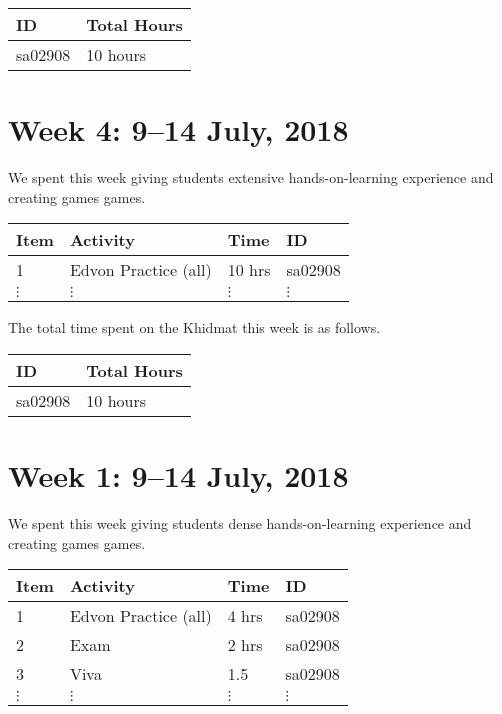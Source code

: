 \documentclass{article}
\begin{document}
\begin{tabular}{|l|l|}
  \hline
  ID & Total Hours\\\hline\hline
  sa02908 & 10 hours\\\hline
\end{tabular}


\newpage 
\section*{Week 4: 9--14 July, 2018}

We spent this week giving students extensive hands-on-learning experience and creating games games.

\begin{tabular}{|l|l|l|l|}
  \hline
  Item  & Activity & Time & ID \\\hline\hline
  1 & Edvon Practice (all) & 10 hrs & sa02908 \\\hline
  $\vdots$ & $\vdots$ & $\vdots$ & $\vdots$ \\\hline
\end{tabular}

The total time spent on the Khidmat this week is as follows.

\begin{tabular}{|l|l|}
  \hline
  ID & Total Hours\\\hline\hline
  sa02908 & 10 hours\\\hline
\end{tabular}


\newpage
\section*{Week 1: 9--14 July, 2018}

We spent this week giving students dense hands-on-learning experience and creating games games.

\begin{tabular}{|l|l|l|l|}
  \hline
  Item  & Activity & Time & ID \\\hline\hline
  1 & Edvon Practice (all) & 4 hrs & sa02908 \\\hline
  2 & Exam & 2 hrs & sa02908 \\\hline
  3 & Viva & 1.5 & sa02908 \\\hline
  $\vdots$ & $\vdots$ & $\vdots$ & $\vdots$ \\\hline
\end{tabular}
\end{document}
